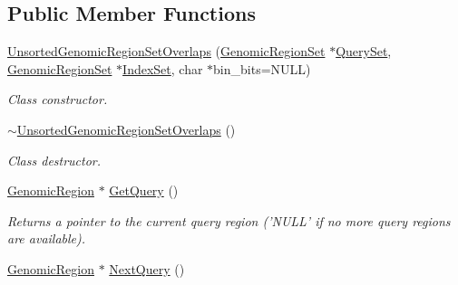 \subsection*{Public Member Functions}
\begin{CompactItemize}
\item 
\hyperlink{classUnsortedGenomicRegionSetOverlaps_aa858364bf0a3d7986c9d0838a73ccab}{UnsortedGenomicRegionSetOverlaps} (\hyperlink{classGenomicRegionSet}{GenomicRegionSet} $\ast$\hyperlink{classGenomicRegionSetOverlaps_e513304379055f6d379bc5907733dbe2}{QuerySet}, \hyperlink{classGenomicRegionSet}{GenomicRegionSet} $\ast$\hyperlink{classGenomicRegionSetOverlaps_c587bf854c827381493735b473622e03}{IndexSet}, char $\ast$bin\_\-bits=NULL)
\begin{CompactList}\small\item\em Class constructor. \item\end{CompactList}\item 
\hypertarget{classUnsortedGenomicRegionSetOverlaps_7682171bb52c651af44e4e8f3bf33f52}{
\hyperlink{classUnsortedGenomicRegionSetOverlaps_7682171bb52c651af44e4e8f3bf33f52}{$\sim$UnsortedGenomicRegionSetOverlaps} ()}
\label{classUnsortedGenomicRegionSetOverlaps_7682171bb52c651af44e4e8f3bf33f52}

\begin{CompactList}\small\item\em Class destructor. \item\end{CompactList}\item 
\hypertarget{classUnsortedGenomicRegionSetOverlaps_bf7e2f8d35f7a9cf8441caa9d765de44}{
\hyperlink{classGenomicRegion}{GenomicRegion} $\ast$ \hyperlink{classUnsortedGenomicRegionSetOverlaps_bf7e2f8d35f7a9cf8441caa9d765de44}{GetQuery} ()}
\label{classUnsortedGenomicRegionSetOverlaps_bf7e2f8d35f7a9cf8441caa9d765de44}

\begin{CompactList}\small\item\em Returns a pointer to the current query region ('NULL' if no more query regions are available). \item\end{CompactList}\item 
\hypertarget{classUnsortedGenomicRegionSetOverlaps_96e68ef99a958665f5da74572edcc854}{
\hyperlink{classGenomicRegion}{GenomicRegion} $\ast$ \hyperlink{classUnsortedGenomicRegionSetOverlaps_96e68ef99a958665f5da74572edcc854}{NextQuery} ()}
\label{classUnsortedGenomicRegionSetOverlaps_96e68ef99a958665f5da74572edcc854}


\end{CompactItemize}
